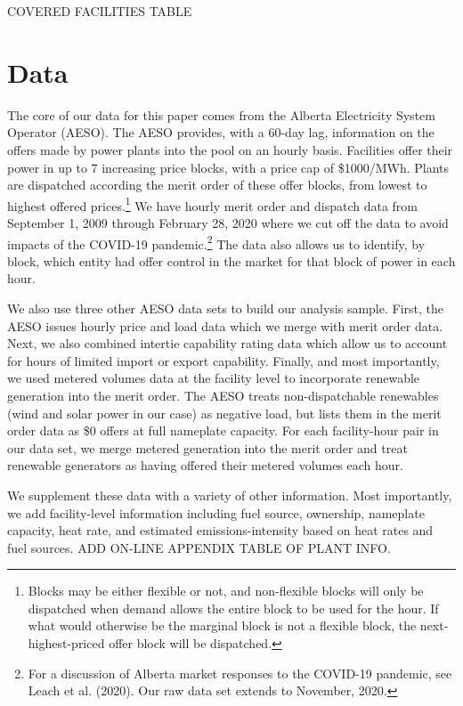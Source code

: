 \documentclass[12pt]{article}
\begin{document}
COVERED FACILITIES TABLE

\section{Data}

The core of our data for this paper comes from the Alberta Electricity System Operator (AESO). The AESO provides, with a 60-day lag, information on the offers made by power plants into the pool on an hourly basis.  Facilities offer their power in up to 7 increasing price blocks, with a price cap of \$1000/MWh. Plants are dispatched according the merit order of these offer blocks, from lowest to highest offered prices.\footnote{Blocks may be either flexible or not, and non-flexible blocks will only be dispatched when demand allows the entire block to be used for the hour. If what would otherwise be the marginal block is not a flexible block, the next-highest-priced offer block will be dispatched.} We have hourly merit order and dispatch data from September 1, 2009 through February 28, 2020 where we cut off the data to avoid impacts of the COVID-19 pandemic.\footnote{For a discussion of Alberta market responses to the COVID-19 pandemic, see Leach et al. (2020). Our raw data set extends to November, 2020.} The data also allows us to identify, by block, which entity had offer control in the market for that block of power in each hour.

We also use three other AESO data sets to build our analysis sample.  First, the AESO issues hourly price and load data which we merge with merit order data.  Next, we also combined intertie capability rating data which allow us to account for hours of limited import or export capability. Finally, and most importantly, we used metered volumes data at the facility level to incorporate renewable generation into the merit order.  The AESO treats non-dispatchable renewables (wind and solar power in our case) as negative load, but lists them in the merit order data as \$0 offers at full nameplate capacity.  For each facility-hour pair in our data set, we merge metered generation into the merit order and treat renewable generators as having offered their metered volumes each hour.

We supplement these data with a variety of other information.  Most importantly, we add facility-level information including fuel source, ownership, nameplate capacity, heat rate, and estimated emissions-intensity based on heat rates and fuel sources.  ADD ON-LINE APPENDIX TABLE OF PLANT INFO.
\end{document}
